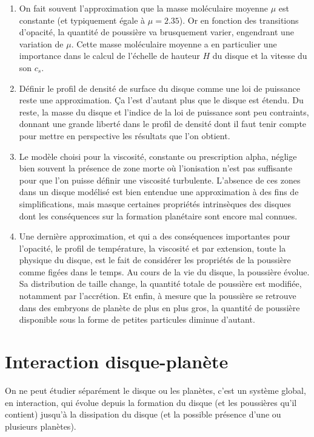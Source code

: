 \begin{enumerate}
\item On fait souvent l'approximation que la masse moléculaire moyenne $\mu$ est constante (et typiquement égale à $\mu=2.35$). Or en fonction des transitions d'opacité, la quantité de poussière va brusquement varier, engendrant une variation de $\mu$. Cette masse moléculaire moyenne a en particulier une importance dans le calcul de l'échelle de hauteur $H$ du disque et la vitesse du son $c_s$. 
\item Définir le profil de densité de surface du disque comme une loi de puissance reste une approximation. Ça l'est d'autant plus que le disque est étendu. Du reste, la masse du disque et l'indice de la loi de puissance sont peu contraints, donnant une grande liberté dans le profil de densité dont il faut tenir compte pour mettre en perspective les résultats que l'on obtient.
\item Le modèle choisi pour la viscosité, constante ou prescription alpha, néglige bien souvent la présence de zone morte où l'ionisation n'est pas suffisante pour que l'on puisse définir une viscosité turbulente. L'absence de ces zones dans un disque modélisé est bien entendue une approximation à des fins de simplifications, mais masque certaines propriétés intrinsèques des disques dont les conséquences sur la formation planétaire sont encore mal connues.
\item Une dernière approximation, et qui a des conséquences importantes pour l'opacité, le profil de température, la viscosité et par extension, toute la physique du disque, est le fait de considérer les propriétés de la poussière comme figées dans le temps. Au cours de la vie du disque, la poussière évolue. Sa distribution de taille change, la quantité totale de poussière est modifiée, notamment par l'accrétion. Et enfin, à mesure que la poussière se retrouve dans des embryons de planète de plus en plus gros, la quantité de poussière disponible sous la forme de petites particules diminue d'autant. 
\end{enumerate}

\section{Interaction disque-planète}
On ne peut étudier séparément le disque ou les planètes, c'est un système global, en interaction, qui évolue depuis la formation du disque (et les poussières qu'il contient) jusqu'à la dissipation du disque (et la possible présence d'une ou plusieurs planètes).

